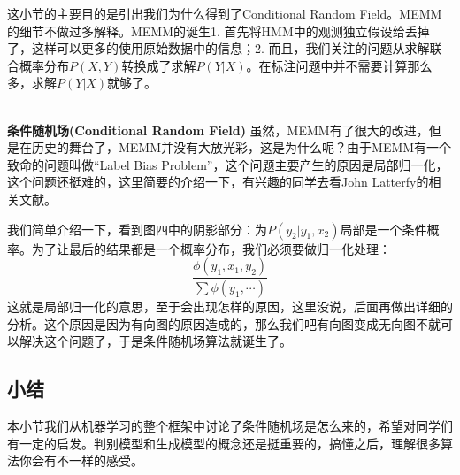 \documentclass[a4paper]{article}
\begin{document}
这小节的主要目的是引出我们为什么得到了Conditional Random Field。MEMM的细节不做过多解释。MEMM的诞生1. 首先将HMM中的观测独立假设给丢掉了，这样可以更多的使用原始数据中的信息；2. 而且，我们关注的问题从求解联合概率分布$P(X,Y)$转换成了求解$P(Y|X)$。在标注问题中并不需要计算那么多，求解$P(Y|X)$就够了。

~\\
\noindent \textbf{条件随机场(Conditional Random Field)}
虽然，MEMM有了很大的改进，但是在历史的舞台了，MEMM并没有大放光彩，这是为什么呢？由于MEMM有一个致命的问题叫做“Label Bias Problem”，这个问题主要产生的原因是局部归一化，这个问题还挺难的，这里简要的介绍一下，有兴趣的同学去看John Latterfy的相关文献。

我们简单介绍一下，看到图四中的阴影部分：为$P(y_2|y_1,x_2)$局部是一个条件概率。为了让最后的结果都是一个概率分布，我们必须要做归一化处理：
$$
\frac{\phi(y_1,x_1,y_2)}{\sum \phi (y_1,\cdots)}
$$
这就是局部归一化的意思，至于会出现怎样的原因，这里没说，后面再做出详细的分析。这个原因是因为有向图的原因造成的，那么我们吧有向图变成无向图不就可以解决这个问题了，于是条件随机场算法就诞生了。

\subsection{小结}
本小节我们从机器学习的整个框架中讨论了条件随机场是怎么来的，希望对同学们有一定的启发。判别模型和生成模型的概念还是挺重要的，搞懂之后，理解很多算法你会有不一样的感受。
\end{document}
